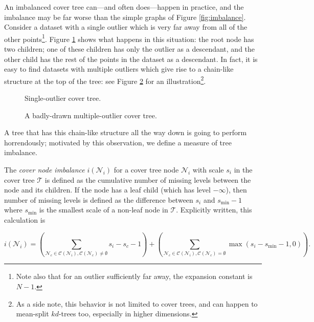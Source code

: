 An imbalanced cover tree can---and often does---happen in practice, and the
imbalance may be far worse than the simple graphs of Figure \ref{fig:imbalance}.
Consider a dataset with a single outlier which is very far away from all of the
other points\footnote{Note also that for an outlier sufficiently far away, the
expansion constant is $N - 1$.}.  Figure \ref{fig:outlier} shows what happens in
this situation: the root node has two children; one of these children has only
the outlier as a descendant, and the other child has the rest of the points in
the dataset as a descendant.  In fact, it is easy to find datasets with multiple
outliers which give rise to a chain-like structure at the top of the tree: see
Figure \ref{fig:outliers} for an illustration\footnote{As a side note, this
behavior is not limited to cover trees, and can happen to mean-split $kd$-trees
too, especially in higher dimensions.}.

\begin{figure}
\begin{center}
  
\end{center}
\caption{Single-outlier cover tree.}
\label{fig:outlier}
\end{figure}

\begin{figure}
\begin{center}
  
\end{center}
\caption{A badly-drawn multiple-outlier cover tree.}
\label{fig:outliers}
\end{figure}

A tree that has this chain-like structure all the way down is going to perform
horrendously; motivated by this observation, we define a measure of tree
imbalance.

\begin{defn}
The {\it cover node imbalance} $i(\mathscr{N}_i)$ for a cover tree node
$\mathscr{N}_i$ with scale $s_i$ in the cover tree $\mathscr{T}$ is defined as
the cumulative number of missing levels between the node and its children.  If
the node has a leaf child (which has level $-\infty$), then number of missing
levels is defined as the difference between $s_i$ and $s_{\min} - 1$ where
$s_{\min}$ is the smallest scale of a non-leaf node in $\mathscr{T}$.
Explicitly written, this calculation is

\begin{equation}
i(\mathscr{N}_i) = \left( \sum_{\mathscr{N}_c \in \mathscr{C}(\mathscr{N}_i),
\mathscr{C}(\mathscr{N}_c) \ne \emptyset} s_i - s_c - 1 \right) + \left(
\sum_{\mathscr{N}_c \in \mathscr{C}(\mathscr{N}_i), \mathscr{C}(\mathscr{N}_c) =
\emptyset} \max(s_i - s_{\min} - 1, 0) \right).
\end{equation}
\end{defn}

